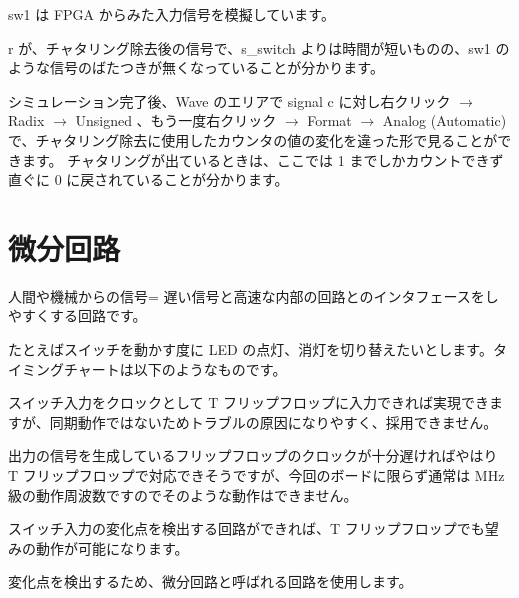 \documentclass[letterpaper,10pt,dvipdfmx]{sphinxmanual}
\begin{document}
sw1 は FPGA からみた入力信号を模擬しています。

r が、チャタリング除去後の信号で、s\_switch よりは時間が短いものの、sw1 のような信号のばたつきが無くなっていることが分かります。

シミュレーション完了後、Wave のエリアで signal c に対し右クリック \(\rightarrow\) Radix \(\rightarrow\) Unsigned 、もう一度右クリック \(\rightarrow\) Format \(\rightarrow\) Analog (Automatic) で、チャタリング除去に使用したカウンタの値の変化を違った形で見ることができます。
チャタリングが出ているときは、ここでは 1 までしかカウントできず直ぐに 0 に戻されていることが分かります。


\section{微分回路}
\label{\detokenize{05_try:id20}}
人間や機械からの信号= 遅い信号と高速な内部の回路とのインタフェースをしやすくする回路です。

たとえばスイッチを動かす度に LED の点灯、消灯を切り替えたいとします。タイミングチャートは以下のようなものです。

\begin{figure}[htbp]
\centering

\noindent{}
\end{figure}

スイッチ入力をクロックとして T フリップフロップに入力できれば実現できますが、同期動作ではないためトラブルの原因になりやすく、採用できません。

出力の信号を生成しているフリップフロップのクロックが十分遅ければやはり T フリップフロップで対応できそうですが、今回のボードに限らず通常は MHz 級の動作周波数ですのでそのような動作はできません。

\begin{figure}[htbp]
\centering

\noindent{}
\end{figure}

スイッチ入力の変化点を検出する回路ができれば、T フリップフロップでも望みの動作が可能になります。

\begin{figure}[htbp]
\centering

\noindent{}
\end{figure}

変化点を検出するため、微分回路と呼ばれる回路を使用します。

\begin{figure}[htbp]
\centering

\noindent{}
\end{figure}
\end{document}
